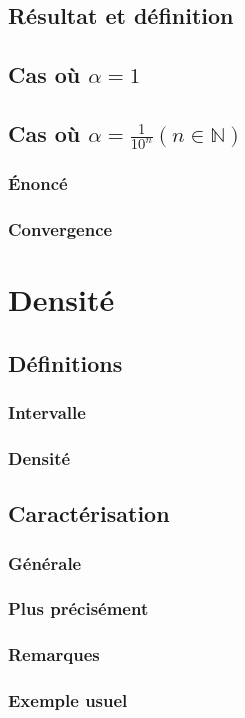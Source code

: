 \documentclass[12pt,a4paper,french]{book}
\begin{document}
		\subsection{Résultat et définition}
		\subsection{Cas où $\alpha = 1$}
		\subsection{Cas où $\alpha = \frac{1}{10^{n}} (n \in \mathbb{N})$}
			\subsubsection{Énoncé}
			\subsubsection{Convergence}
	\section{Densité}
		\subsection{Définitions}
			\subsubsection{Intervalle}
			\subsubsection{Densité}
		\subsection{Caractérisation}
			\subsubsection{Générale}
			\subsubsection{Plus précisément}
			\subsubsection{Remarques}
			\subsubsection{Exemple usuel}
\end{document}
